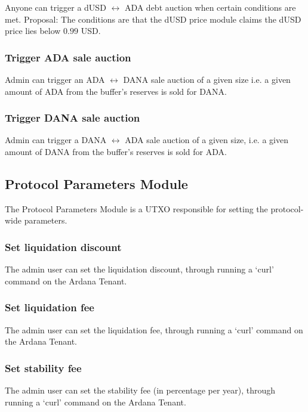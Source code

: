 \documentclass{article} %
\begin{document}
Anyone can trigger a dUSD $\leftrightarrow$ ADA debt auction when certain
conditions are met.
Proposal: The conditions are that the dUSD price module claims the dUSD price
lies below $0.99$ USD.

\subsubsection{Trigger ADA sale auction}

Admin can trigger an ADA $\leftrightarrow$ DANA sale auction of a given size
i.e. a given amount of ADA from the buffer's reserves is sold for DANA.

\subsubsection{Trigger DANA sale auction}

Admin can trigger a DANA $\leftrightarrow$ ADA sale auction of a given size,
i.e. a given amount of DANA from the buffer's reserves is sold for ADA.

\subsection{Protocol Parameters Module}

The Protocol Parameters Module is a UTXO responsible for setting the protocol-wide parameters.

\subsubsection{Set liquidation discount}

The admin user can set the liquidation discount, through running a `curl'
command on the Ardana Tenant.

\subsubsection{Set liquidation fee}

The admin user can set the liquidation fee, through running a `curl' command on
the Ardana Tenant.

\subsubsection{Set stability fee}

The admin user can set the stability fee (in percentage per year), through
running a `curl' command on the Ardana Tenant.
\end{document}
